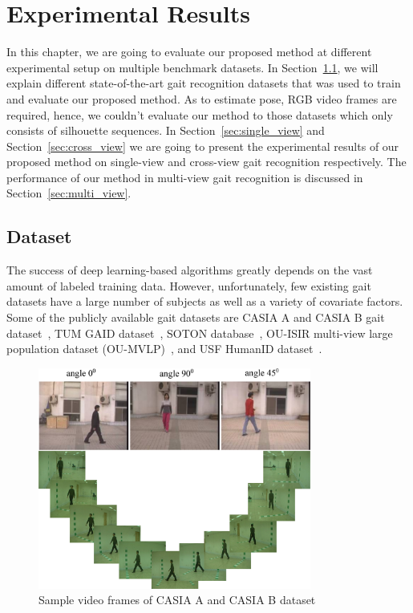 \chapter{Experimental Results}\label{ch:experimental_result}
In this chapter, we are going to evaluate our proposed method at different experimental setup on multiple benchmark datasets. In Section~\ref{sec:datasets}, we will explain different state-of-the-art gait recognition datasets that was used to train and evaluate our proposed method. As to estimate pose, RGB video frames are required, hence, we couldn't evaluate our method to those datasets which only consists of silhouette sequences.  In Section~\ref{sec:single_view} and Section~\ref{sec:cross_view} we are going to present the experimental results of our proposed method on single-view and cross-view gait recognition respectively. The performance of our method in multi-view gait recognition is discussed in Section~\ref{sec:multi_view}.


\section{Dataset} \label{sec:datasets}
The success of deep learning-based algorithms greatly depends on the vast amount of labeled training data. However, unfortunately, few existing gait datasets have a large number of subjects as well as a variety of covariate factors. Some of the publicly available gait datasets are CASIA A and CASIA B gait dataset~\cite{Yu_06}, TUM GAID dataset~\cite{Hofmann_14}, SOTON database~\cite{Shutler_04}, OU-ISIR multi-view large population dataset (OU-MVLP)~\cite{Noriko_18}, and USF HumanID dataset~\cite{Sarkar_05}. 

\begin{figure}
	\centering
	\includegraphics[width = 0.8\textwidth]{figures/casia_dataset.eps}
	\caption [Sample video frames of CASIA A and CASIA B dataset]
	{Sample video frames of CASIA A and CASIA B dataset
	}
	\label{fig:casia_dataset}
\end{figure} 

